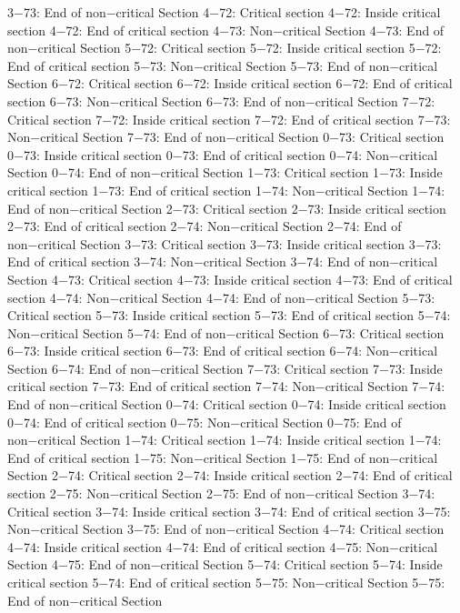 3−73: End of non−critical Section
4−72: Critical section
4−72: Inside critical section
4−72: End of critical section
4−73: Non−critical Section
4−73: End of non−critical Section
5−72: Critical section
5−72: Inside critical section
5−72: End of critical section
5−73: Non−critical Section
5−73: End of non−critical Section
6−72: Critical section
6−72: Inside critical section
6−72: End of critical section
6−73: Non−critical Section
6−73: End of non−critical Section
7−72: Critical section
7−72: Inside critical section
7−72: End of critical section
7−73: Non−critical Section
7−73: End of non−critical Section
0−73: Critical section
0−73: Inside critical section
0−73: End of critical section
0−74: Non−critical Section
0−74: End of non−critical Section
1−73: Critical section
1−73: Inside critical section
1−73: End of critical section
1−74: Non−critical Section
1−74: End of non−critical Section
2−73: Critical section
2−73: Inside critical section
2−73: End of critical section
2−74: Non−critical Section
2−74: End of non−critical Section
3−73: Critical section
3−73: Inside critical section
3−73: End of critical section
3−74: Non−critical Section
3−74: End of non−critical Section
4−73: Critical section
4−73: Inside critical section
4−73: End of critical section
4−74: Non−critical Section
4−74: End of non−critical Section
5−73: Critical section
5−73: Inside critical section
5−73: End of critical section
5−74: Non−critical Section
5−74: End of non−critical Section
6−73: Critical section
6−73: Inside critical section
6−73: End of critical section
6−74: Non−critical Section
6−74: End of non−critical Section
7−73: Critical section
7−73: Inside critical section
7−73: End of critical section
7−74: Non−critical Section
7−74: End of non−critical Section
0−74: Critical section
0−74: Inside critical section
0−74: End of critical section
0−75: Non−critical Section
0−75: End of non−critical Section
1−74: Critical section
1−74: Inside critical section
1−74: End of critical section
1−75: Non−critical Section
1−75: End of non−critical Section
2−74: Critical section
2−74: Inside critical section
2−74: End of critical section
2−75: Non−critical Section
2−75: End of non−critical Section
3−74: Critical section
3−74: Inside critical section
3−74: End of critical section
3−75: Non−critical Section
3−75: End of non−critical Section
4−74: Critical section
4−74: Inside critical section
4−74: End of critical section
4−75: Non−critical Section
4−75: End of non−critical Section
5−74: Critical section
5−74: Inside critical section
5−74: End of critical section
5−75: Non−critical Section
5−75: End of non−critical Section
